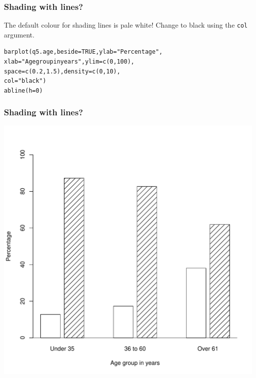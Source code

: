 \documentclass{beamer}\usepackage[]{graphicx}\usepackage[]{color}
\makeatletter
\newcommand{\hlnum}[1]{\textcolor[rgb]{0.533,0,0.133}{#1}}%
\newcommand{\hlstr}[1]{\textcolor[rgb]{0.667,0.267,0}{#1}}%
\newcommand{\hlstd}[1]{\textcolor[rgb]{0,0,0}{#1}}%
\newcommand{\hlkwc}[1]{\textcolor[rgb]{0,0,0.4}{#1}}%
\newcommand{\hlkwd}[1]{\textcolor[rgb]{0,0.267,0.4}{#1}}%
\newenvironment{kframe}{%
 \def\at@end@of@kframe{}%
 \ifinner\ifhmode%
  \def\at@end@of@kframe{\end{minipage}}%
  \begin{minipage}{\columnwidth}%
 \fi\fi%
 \def\FrameCommand##1{\hskip\@totalleftmargin \hskip-\fboxsep
 \colorbox{shadecolor}{##1}\hskip-\fboxsep
     \hskip-\linewidth \hskip-\@totalleftmargin \hskip\columnwidth}%
 \MakeFramed {\advance\hsize-\width
   \@totalleftmargin\z@ \linewidth\hsize
   \@setminipage}}%
 {\par\unskip\endMakeFramed%
 \at@end@of@kframe}
\newenvironment{knitrout}{}{} %
\makeatother
\begin{document}
\begin{frame}[fragile]
  \frametitle{Shading with lines?}
The default colour for shading lines is pale white! Change to black using the \texttt{col} argument.
\begin{knitrout}
\color{fgcolor}\begin{kframe}
\begin{alltt}
\hlkwd{barplot}\hlstd{(q5.age,} \hlkwc{beside} \hlstd{=} \hlnum{TRUE}\hlstd{,} \hlkwc{ylab} \hlstd{=} \hlstr{"Percentage"}\hlstd{,}
        \hlkwc{xlab} \hlstd{=} \hlstr{"Age group in years"}\hlstd{,} \hlkwc{ylim} \hlstd{=} \hlkwd{c}\hlstd{(}\hlnum{0}\hlstd{,} \hlnum{100}\hlstd{),}
        \hlkwc{space} \hlstd{=} \hlkwd{c}\hlstd{(}\hlnum{0.2}\hlstd{,} \hlnum{1.5}\hlstd{),} \hlkwc{density} \hlstd{=} \hlkwd{c}\hlstd{(}\hlnum{0}\hlstd{,} \hlnum{10}\hlstd{),}
        \hlkwc{col} \hlstd{=} \hlstr{"black"}\hlstd{)}
\hlkwd{abline}\hlstd{(}\hlkwc{h} \hlstd{=} \hlnum{0}\hlstd{)}
\end{alltt}
\end{kframe}
\end{knitrout}
\end{frame}


\begin{frame}[fragile]
  \frametitle{Shading with lines?}
\begin{knitrout}
\color{fgcolor}

{\centering \includegraphics[width=0.6\linewidth]{figure/bar5-1} 

}



\end{knitrout}
\end{frame}
\end{document}
